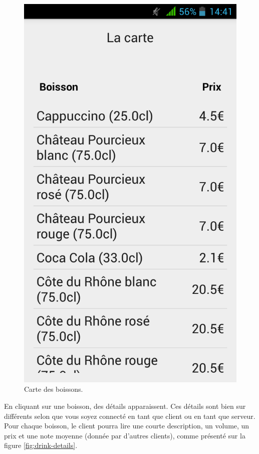\begin{figure}[H]
	\centering
	\includegraphics[scale=0.15]{img/carte.png}
	\caption{Carte des boissons.}
	\label{fig:carte}
\end{figure}

En cliquant sur une boisson, des détails apparaissent. Ces détails sont bien
sur différents selon que vous soyez connecté en tant que client ou en tant
que serveur. Pour chaque boisson, le client pourra lire une courte
description, un volume, un prix et une note moyenne (donnée par d'autres
clients), comme présenté sur la figure \ref{fig:drink-details}.

